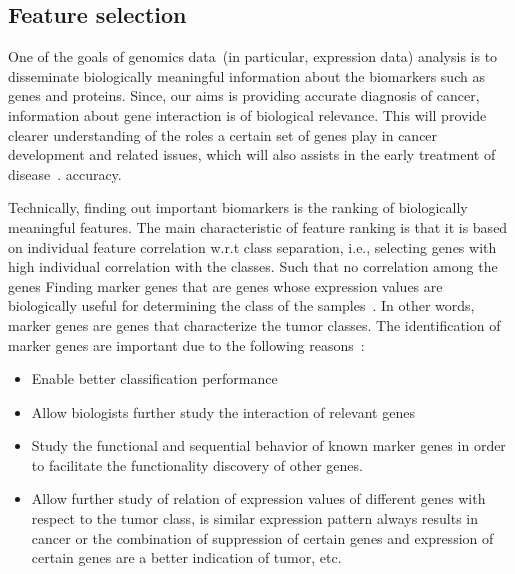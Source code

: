 \subsection{Feature selection}
One of the goals of genomics data~(in particular, expression data) analysis is to disseminate biologically meaningful information about the biomarkers such as genes and proteins. 
Since, our aims is providing accurate diagnosis of cancer, information about gene interaction is of biological relevance. This will provide clearer understanding of the roles a certain set of genes play in cancer development and related issues, which will also assists in the  early treatment of disease~\cite{lu2003cancer}. %
accuracy.

\hspace*{3.5mm}Technically, finding out important biomarkers is the ranking of biologically meaningful features. The main characteristic of feature ranking is that it is based on individual feature correlation w.r.t class separation, i.e., selecting genes with high individual correlation with the classes. Such that no correlation among the genes Finding marker genes that are genes whose expression values are biologically useful for determining the class of the samples~\cite{lu2003cancer}. In other words, marker genes are genes that characterize the tumor classes. The identification of marker genes are important due to the following reasons~\cite{lu2003cancer}:

\begin{itemize}[noitemsep]
    \item Enable better classification performance
    \item Allow biologists further study the interaction of relevant genes 
    \item Study the functional and sequential behavior of known marker genes in order to facilitate the functionality discovery of other genes.
    \item Allow further study of relation of expression values of different genes with respect to the tumor class, is similar expression pattern always results in cancer or the combination of suppression of certain genes and expression of certain genes are a better indication of tumor, etc.
\end{itemize}

